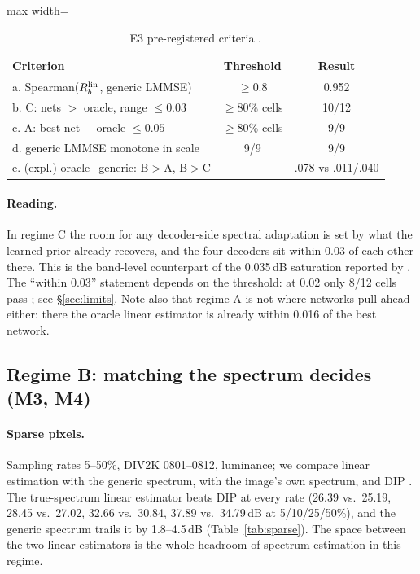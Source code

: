 \begin{table}[t]\centering\small
\caption{E3 pre-registered criteria .}\label{tab:e3}
\begin{adjustbox}{max width=\linewidth}\begin{tabular}{lcc}\toprule
Criterion & Threshold & Result\\\midrule
a. Spearman($R_b^{\mathrm{lin}}$, generic LMMSE) & $\ge0.8$ & 0.952\\
b. C: nets $>$ oracle, range $\le0.03$ & $\ge80\%$ cells & 10/12\\
c. A: best net $-$ oracle $\le0.05$ & $\ge80\%$ cells & 9/9\\
d. generic LMMSE monotone in scale & 9/9 & 9/9\\
e. (expl.) oracle$-$generic: B$>$A, B$>$C & -- & .078 vs .011/.040\\
\bottomrule\end{tabular}\end{adjustbox}
\end{table}

\paragraph{Reading.} In regime C the room for any decoder-side spectral
adaptation is set by what the learned prior already recovers, and the four
decoders sit within 0.03 of each other there. This is the band-level
counterpart of the 0.035\,dB saturation reported by \citet{nasir2026empirical}.
The ``within 0.03'' statement depends on the threshold: at 0.02 only 8/12 cells
pass ; see \S\ref{sec:limits}. Note also that regime A is
not where networks pull ahead either: there the oracle linear estimator is
already within 0.016 of the best network.

\subsection{Regime B: matching the spectrum decides (M3, M4)}\label{sec:exp-b}

\paragraph{Sparse pixels.} Sampling rates 5--50\%, DIV2K 0801--0812,
luminance; we compare linear estimation with the generic spectrum, with the
image's own spectrum, and DIP \citep{ulyanov2018dip} . The true-spectrum linear estimator beats DIP at every rate
(26.39 vs.\ 25.19, 28.45 vs.\ 27.02, 32.66 vs.\ 30.84, 37.89 vs.\ 34.79\,dB at
5/10/25/50\%), and the generic spectrum trails it by 1.8--4.5\,dB
(Table~\ref{tab:sparse}). The space between the two linear estimators is the
whole headroom of spectrum estimation in this regime.

